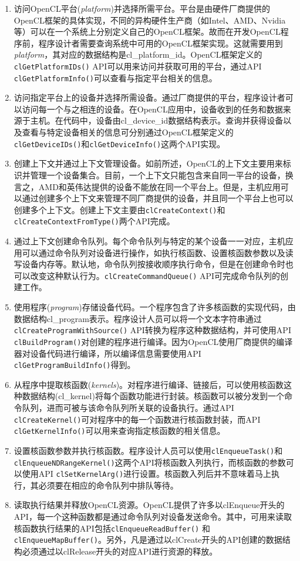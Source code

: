 \begin{enumerate}
  \item 访问OpenCL平台(\emph{platform})并选择所需平台。平台是由硬件厂商提供的OpenCL框架的具体实现，不同的异构硬件生产商（如Intel、AMD、Nvidia等）可以在一个系统上分别定义自己的OpenCL框架。故而在开发OpenCL程序前，程序设计者需要查询系统中可用的OpenCL框架实现。这就需要用到\emph{platform}，其对应的数据结构是cl\_platform\_id。OpenCL框架定义的\texttt{clGetPlatformIDs()} API可以用来访问并获取可用的平台，通过API \texttt{clGetPlatformInfo()}可以查看与指定平台相关的信息。
  \item 访问指定平台上的设备并选择所需设备。通过厂商提供的平台，程序设计者可以访问每一个与之相连的设备。在OpenCL应用中，设备收到的任务和数据来源于主机。在代码中，设备由cl\_device\_id数据结构表示。查询并获得设备以及查看与特定设备相关的信息可分别通过OpenCL框架定义的\texttt{clGetDeviceIDs()}和\texttt{clGetDeviceInfo()}这两个API实现。
  \item 创建上下文并通过上下文管理设备。如前所述，OpenCL的上下文主要用来标识并管理一个设备集合。目前，一个上下文只能包含来自同一平台的设备，换言之，AMD和英伟达提供的设备不能放在同一个平台上。但是，主机应用可以通过创建多个上下文来管理不同厂商提供的设备，并且同一个平台上也可以创建多个上下文。创建上下文主要由\texttt{clCreateContext()}和\texttt{clCreateContextFromType()}两个API完成。
  \item 通过上下文创建命令队列。每个命令队列与特定的某个设备一一对应，主机应用可以通过命令队列对设备进行操作，如执行核函数、设置核函数参数以及读写设备内存等。默认地，命令队列按接收顺序执行命令，但是在创建命令时也可以改变这种默认行为。\texttt{clCreateCommandQueue()} API可完成命令队列的创建工作。
  \item 使用程序(\emph{program})存储设备代码。一个程序包含了许多核函数的实现代码，由数据结构cl\_program表示。程序设计人员可以将一个文本字符串通过 \texttt{clCreateProgramWithSource()} API转换为程序这种数据结构，并可使用API \texttt{clBuildProgram()}对创建的程序进行编译。因为OpenCL使用厂商提供的编译器对设备代码进行编译，所以编译信息需要使用API \texttt{clGetProgramBuildInfo()}得到。
  \item 从程序中提取核函数(\emph{kernels})。对程序进行编译、链接后，可以使用核函数这种数据结构(cl\_kernel)将每个函数功能进行封装。核函数可以被分发到一个命令队列，进而可被与该命令队列所关联的设备执行。通过API \texttt{clCreateKernel()}可对程序中的每一个函数进行核函数封装，而API \texttt{clGetKernelInfo()}可以用来查询指定核函数的相关信息。
  \item 设置核函数参数并执行核函数。程序设计人员可以使用\texttt{clEnqueueTask()}和\texttt{clEnqueueNDRangeKernel()}这两个API将核函数入列执行，而核函数的参数可以使用API \texttt{clSetKernelArg()}进行设置。核函数入列后并不意味着马上执行，其必须要在相应的命令队列中排队等待。
  \item 读取执行结果并释放OpenCL资源。OpenCL提供了许多以clEnqueue开头的API，每一个这种函数都是通过命令队列对设备发送命令。其中，可用来读取核函数执行结果的API包括\texttt{clEnqueueReadBuffer()} 和\texttt{clEnqueueMapBuffer()}。另外，凡是通过以clCreate开头的API创建的数据结构必须通过以clRelease开头的对应API进行资源的释放。
\end{enumerate}

